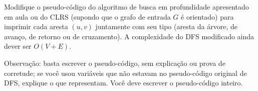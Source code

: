 Modifique o pseudo-código do algoritmo de busca em profundidade apresentado em aula ou do CLRS (supondo que o grafo de entrada $G$ é orientado) para imprimir cada aresta $(u, v)$ juntamente com seu tipo (aresta da árvore, de avanço, de retorno ou de cruzamento). A complexidade do DFS modificado ainda dever ser $O(V + E)$.

Observação: basta escrever o pseudo-código, sem explicação ou prova de corretude; se você usou variáveis que não estavam no pseudo-código original de DFS, explique o que representam. Você deve escrever o pseudo-código inteiro.

\itemdsep
